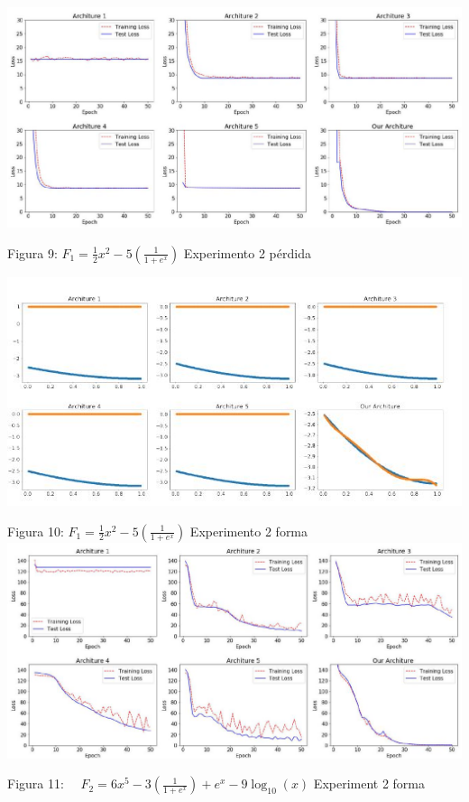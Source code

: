 \documentclass[10pt]{article}
\begin{document}
\includegraphics[max width=\textwidth]{2022_09_28_0067ec14010042dbf918g-11}

Figura 9: $F_{1}=\frac{1}{2} x^{2}-5\left(\frac{1}{1+e^{x}}\right)$ Experimento 2 pérdida

\includegraphics[max width=\textwidth]{2022_09_28_0067ec14010042dbf918g-11(1)}

Figura 10: $F_{1}=\frac{1}{2} x^{2}-5\left(\frac{1}{1+e^{x}}\right)$ Experimento 2 forma\\

\includegraphics[max width=\textwidth]{2022_09_28_0067ec14010042dbf918g-12}

Figura 11: $\quad F_{2}=6 x^{5}-3\left(\frac{1}{1+e^{x}}\right)+e^{x}-9 \log _{10}(x)$ Experiment 2 forma
\end{document}
